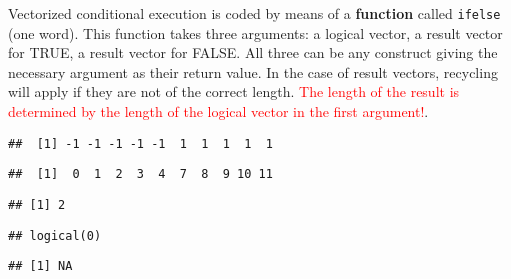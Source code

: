 \documentclass[paper=a4,10pt,div=17,headsepline,BCOR=12mm,twoside,open=right]{scrbook}\usepackage{knitr}
\begin{document}
Vectorized conditional execution is coded by means of a \textbf{function} called \texttt{ifelse} (one word). This function takes three arguments: a logical vector, a result vector for TRUE, a result vector for FALSE. All three can be any construct giving the necessary argument as their return value. In the case of result vectors, recycling will apply if they are not of the correct length. \textcolor{red}{The length of the result is determined by the length of the logical vector in the first argument!}.

\begin{knitrout}\footnotesize
{}\color{fgcolor}\begin{kframe}
\begin{alltt}
 \hlkwb{<-} \hlopt{:}
 \hlopt{>} \hlstd{,} \hlstd{,} \hlopt{-}\hlstd{)}
\end{alltt}
\begin{verbatim}
##  [1] -1 -1 -1 -1 -1  1  1  1  1  1
\end{verbatim}
\begin{alltt}
 \hlopt{>}  \hlopt{+}  \hlopt{-} \hlstd{)}
\end{alltt}
\begin{verbatim}
##  [1]  0  1  2  3  4  7  8  9 10 11
\end{verbatim}
\begin{alltt}
\hlstd{(}\hlopt{>} \hlopt{+}  \hlopt{-} \hlstd{)} 
\end{alltt}
\begin{verbatim}
## [1] 2
\end{verbatim}
\begin{alltt}
\hlstd{(}\hlstd{(} \hlopt{+}  \hlopt{-} \hlstd{)} 
\end{alltt}
\begin{verbatim}
## logical(0)
\end{verbatim}
\begin{alltt}
\hlstd{(} \hlopt{+}  \hlopt{-} \hlstd{)} 
\end{alltt}
\begin{verbatim}
## [1] NA
\end{verbatim}
\end{kframe}
\end{knitrout}
\end{document}
